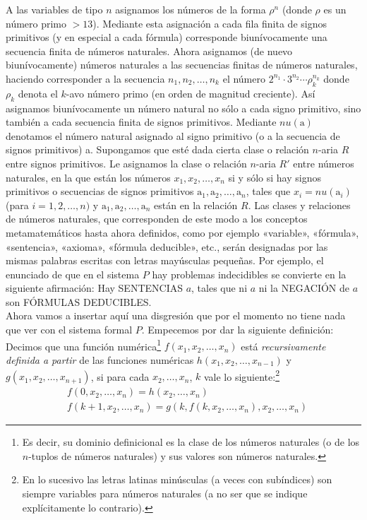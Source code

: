A las variables de tipo $n$ asignamos los números de la forma $\rho^n$ (donde $\rho$ es un número primo $> 13$). Mediante esta asignación a cada fila finita de 
signos primitivos (y en especial a cada fórmula) corresponde biunívocamente una secuencia finita de números naturales. Ahora asignamos (de nuevo biunívocamente)
números naturales a las secuencias finitas de números naturales, haciendo corresponder a la secuencia $n_1, n_2, \dots, n_k$ el número 
$2^{n_1} \cdot 3^{n_2} \cdots \rho^{n_k}_k$ donde $\rho_k$ denota el $k$-avo número primo (en orden de magnitud creciente). Así asignamos biunívocamente un
número natural no sólo a cada signo primitivo, sino también a cada secuencia finita de signos primitivos. Mediante $nu(\text{a})$ denotamos
el número natural asignado al signo primitivo (o a la secuencia de signos primitivos) a. Supongamos que esté dada cierta clase o relación $n$-aria $R$ entre signos
primitivos. Le asignamos la clase o relación $n$-aria $R'$ entre números naturales, en la que están los números $x_1, x_2, \dots, x_n$ si y sólo si hay signos primitivos
o secuencias de signos primitivos $\text{a}_1, \text{a}_2, \dots, \text{a}_n$, tales que $x_i = nu(\text{a}_i)$ (para $i = 1, 2, \dots, n)$ y 
$\text{a}_1, \text{a}_2, \dots, \text{a}_n$ están en la relación $R$. Las clases y relaciones de números naturales, que corresponden de este modo a los conceptos
metamatemáticos hasta ahora definidos, como por ejemplo «variable», «fórmula», «sentencia», «axioma», «fórmula deducible», etc., serán designadas por las mismas 
palabras escritas con letras mayúsculas pequeñas. Por ejemplo, el enunciado de que en el sistema $P$ hay problemas indecidibles se convierte en la siguiente afirmación:
Hay SENTENCIAS $a$, tales que ni $a$ ni la NEGACIÓN de $a$ son FÓRMULAS DEDUCIBLES.\\

Ahora vamos a insertar aquí una disgresión que por el momento no tiene nada que ver con el sistema formal $P$. Empecemos por dar la siguiente definición: 
Decimos que una función numérica\footnote{Es decir, su dominio definicional es la clase de los números naturales (o de los $n$-tuplos de números naturales) 
y sus valores son números naturales.} $f(x_1, x_2, \dots, x_n)$ está \textit{recursivamente definida a partir} de las funciones numéricas $h(x_1, x_2, \dots, x_{n-1})$
y $g(x_1, x_2, \dots, x_{n+1})$, si para cada $x_2, \dots, x_n$, $k$ vale lo siguiente:\footnote{En lo sucesivo las letras latinas minúsculas (a veces con subíndices) 
son siempre variables para números naturales (a no ser que se indique explícitamente lo contrario).}
\begin{equation} \label{eq:recdef}
    \begin{aligned}
        &f(0, x_2, \dots, x_n) = h(x_2, \dots, x_n) \\
        &f(k+1, x_2, \dots, x_n) = g(k, f(k, x_2, \dots, x_n), x_2, \dots, x_n) 
    \end{aligned}
\end{equation}


